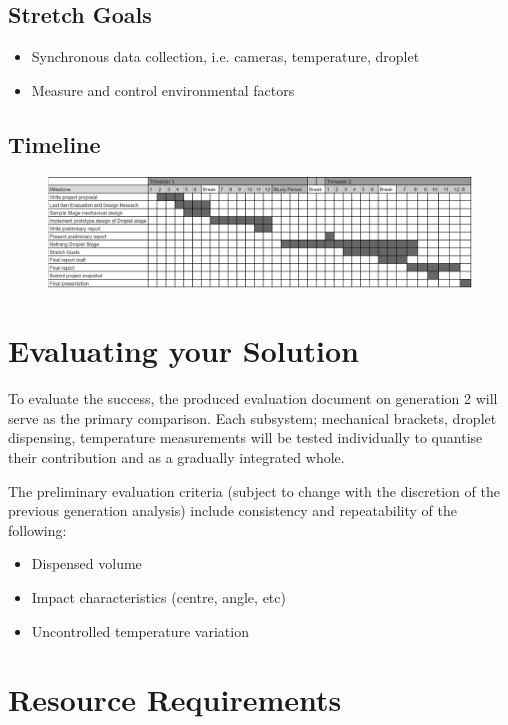 \documentclass[11pt, a4paper, twoside, openright]{report}
\begin{document}
\subsection{Stretch Goals}
\begin{itemize}
  \item Synchronous data collection, i.e. cameras, temperature, droplet
  \item Measure and control environmental factors
\end{itemize}

\subsection{Timeline}
\begin{figure}[h]
  \centering
  \includegraphics[width=\textwidth]{Figures/Gantt-chart_filler.png}
\end{figure}

\section{Evaluating your Solution}
To evaluate the success, the produced evaluation document on generation 2 will serve as the primary comparison. Each subsystem; mechanical brackets, droplet dispensing, temperature measurements will be tested individually to quantise their contribution and as a gradually integrated whole.

The preliminary evaluation criteria (subject  to change with the discretion of the previous generation analysis) include consistency and repeatability of the following:
\begin{itemize}
  \item Dispensed volume
  \item Impact characteristics (centre, angle, etc)
  \item Uncontrolled temperature variation
\end{itemize}



\section{Resource Requirements}
\end{document}
